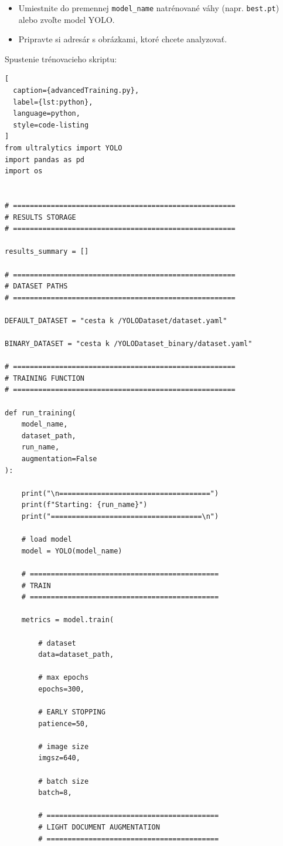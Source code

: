 \begin{itemize}
    \item Umiestnite do premennej \texttt{model\_name} natrénované váhy (napr. \texttt{best.pt}) alebo zvoľte model YOLO.
    \item Pripravte si adresár s obrázkami, ktoré chcete analyzovať.
\end{itemize}
Spustenie trénovacieho skriptu:
\begin{lstlisting}[
  caption={advancedTraining.py},
  label={lst:python},
  language=python,
  style=code-listing
]
from ultralytics import YOLO
import pandas as pd
import os


# =====================================================
# RESULTS STORAGE
# =====================================================

results_summary = []

# =====================================================
# DATASET PATHS
# =====================================================

DEFAULT_DATASET = "cesta k /YOLODataset/dataset.yaml"

BINARY_DATASET = "cesta k /YOLODataset_binary/dataset.yaml"

# =====================================================
# TRAINING FUNCTION
# =====================================================

def run_training(
    model_name,
    dataset_path,
    run_name,
    augmentation=False
):

    print("\n====================================")
    print(f"Starting: {run_name}")
    print("====================================\n")

    # load model
    model = YOLO(model_name)

    # =============================================
    # TRAIN
    # =============================================

    metrics = model.train(

        # dataset
        data=dataset_path,

        # max epochs
        epochs=300,

        # EARLY STOPPING
        patience=50,

        # image size
        imgsz=640,

        # batch size
        batch=8,

        # =========================================
        # LIGHT DOCUMENT AUGMENTATION
        # =========================================


\end{lstlisting}
